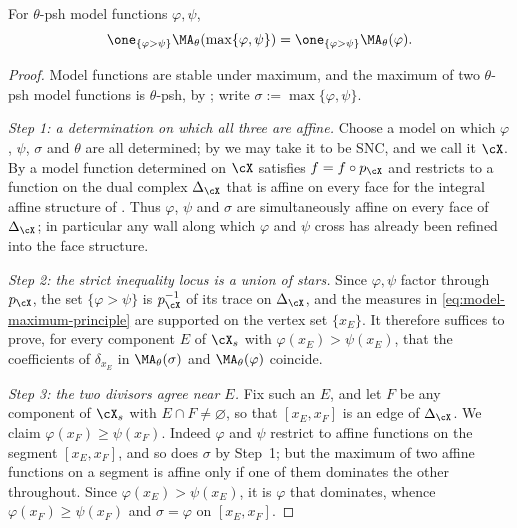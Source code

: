 \begin{proposition}\label{prop:model-maximum-principle}
For \(\theta\)-psh model functions \(\varphi,\psi\),
\begin{equation}
\label{eq:model-maximum-principle}
 \one_{\{\varphi>\psi\}}
 \MA_\theta(\max\{\varphi,\psi\})
 =\one_{\{\varphi>\psi\}}\MA_\theta(\varphi).
\end{equation}
\end{proposition}

\begin{proof}
Model functions are stable under maximum, and the maximum of two
\(\theta\)-psh model functions is \(\theta\)-psh, by
; write \(\sigma:=\max\{\varphi,\psi\}\).

\emph{Step 1: a determination on which all three are affine.}  Choose a
model on which \(\varphi\), \(\psi\), \(\sigma\) and \(\theta\) are all
determined; by  we may take it to be SNC, and we call
it \(\cX\).  By  a model function determined
on \(\cX\) satisfies \(f=f\circ p_{\cX}\) and restricts to a function on the
dual complex \(\Delta_{\cX}\) that is affine on every face for the integral
affine structure of .  Thus \(\varphi\), \(\psi\)
and \(\sigma\) are simultaneously affine on every face of \(\Delta_{\cX}\);
in particular any wall along which \(\varphi\) and \(\psi\) cross has already
been refined into the face structure.

\emph{Step 2: the strict inequality locus is a union of stars.}  Since
\(\varphi,\psi\) factor through \(p_{\cX}\), the set \(\{\varphi>\psi\}\) is
\(p_{\cX}^{-1}\) of its trace on \(\Delta_{\cX}\), and the measures in
\eqref{eq:model-maximum-principle} are supported on the vertex set
\(\{x_E\}\).  It therefore suffices to prove, for every component \(E\) of
\(\cX_s\) with \(\varphi(x_E)>\psi(x_E)\), that the coefficients of
\(\delta_{x_E}\) in \(\MA_\theta(\sigma)\) and \(\MA_\theta(\varphi)\)
coincide.

\emph{Step 3: the two divisors agree near \(E\).}  Fix such an \(E\), and
let \(F\) be any component of \(\cX_s\) with \(E\cap F\neq\varnothing\), so
that \([x_E,x_F]\) is an edge of \(\Delta_{\cX}\).  We claim
\(\varphi(x_F)\geq\psi(x_F)\).  Indeed \(\varphi\) and \(\psi\) restrict to
affine functions on the segment \([x_E,x_F]\), and so does \(\sigma\) by
Step~1; but the maximum of two affine functions on a segment is affine only
if one of them dominates the other throughout.  Since
\(\varphi(x_E)>\psi(x_E)\), it is \(\varphi\) that dominates, whence
\(\varphi(x_F)\geq\psi(x_F)\) and \(\sigma=\varphi\) on \([x_E,x_F]\).


\end{proof}
